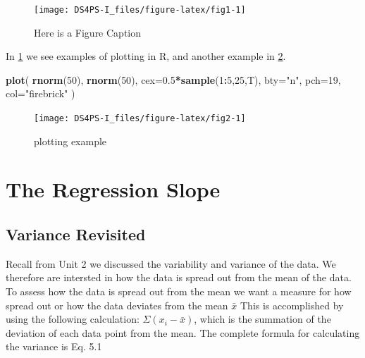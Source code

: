 \documentclass[]{book}
\newenvironment{Shaded}{\begin{snugshade}}{\end{snugshade}}
\newcommand{\DataTypeTok}[1]{\textcolor[rgb]{0.13,0.29,0.53}{#1}}
\newcommand{\DecValTok}[1]{\textcolor[rgb]{0.00,0.00,0.81}{#1}}
\newcommand{\FloatTok}[1]{\textcolor[rgb]{0.00,0.00,0.81}{#1}}
\newcommand{\KeywordTok}[1]{\textcolor[rgb]{0.13,0.29,0.53}{\textbf{#1}}}
\newcommand{\NormalTok}[1]{#1}
\newcommand{\OperatorTok}[1]{\textcolor[rgb]{0.81,0.36,0.00}{\textbf{#1}}}
\newcommand{\StringTok}[1]{\textcolor[rgb]{0.31,0.60,0.02}{#1}}
\theoremstyle{definition}
\theoremstyle{definition}
\theoremstyle{definition}
\theoremstyle{remark}
\begin{document}
\begin{figure}

{\centering \texttt{[image: DS4PS-I\_files/figure-latex/fig1-1]} 

}

\caption{Here is a Figure Caption}\label{fig:fig1}
\end{figure}

In \ref{fig:fig1} we see examples of plotting in R, and another example
in \ref{fig:fig2}.

\begin{Shaded}
\begin{Highlighting}[]

\KeywordTok{plot}\NormalTok{( }\KeywordTok{rnorm}\NormalTok{(}\DecValTok{50}\NormalTok{), }\KeywordTok{rnorm}\NormalTok{(}\DecValTok{50}\NormalTok{), }\DataTypeTok{cex=}\FloatTok{0.5}\OperatorTok{*}\KeywordTok{sample}\NormalTok{(}\DecValTok{1}\OperatorTok{:}\DecValTok{5}\NormalTok{,}\DecValTok{25}\NormalTok{,T), }\DataTypeTok{bty=}\StringTok{"n"}\NormalTok{, }\DataTypeTok{pch=}\DecValTok{19}\NormalTok{, }\DataTypeTok{col=}\StringTok{"firebrick"}\NormalTok{ )}
\end{Highlighting}
\end{Shaded}

\begin{figure}

{\centering \texttt{[image: DS4PS-I\_files/figure-latex/fig2-1]} 

}

\caption{plotting example}\label{fig:fig2}
\end{figure}

\hypertarget{the-regression-slope}{%
\chapter{The Regression Slope}\label{the-regression-slope}}

\hypertarget{variance-revisited}{%
\section{Variance Revisited}\label{variance-revisited}}

Recall from Unit 2 we discussed the variability and variance of the
data. We therefore are intersted in how the data is spread out from the
mean of the data. To assess how the data is spread out from the mean we
want a measure for how spread out or how the data deviates from the mean
\(\bar{x}\) This is accomplished by using the following calculation:
\(\Sigma(x_{i} - \bar{x})\), which is the summation of the deviation of
each data point from the mean. The complete formula for calculating the
variance is Eq. 5.1
\end{document}
